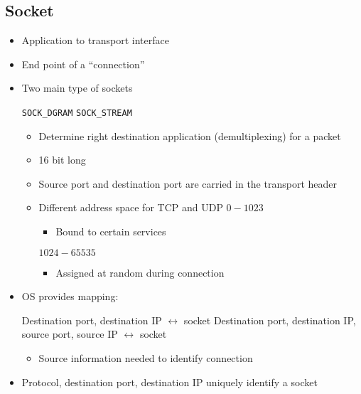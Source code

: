 \subsection{Socket}
\begin{itemize}
    \item Application to transport interface
    \item End point of a ``connection''
    \item Two main type of sockets
        \begin{itemize}
             \verb+SOCK_DGRAM+
             \verb+SOCK_STREAM+
        \end{itemize}
        \begin{itemize}
            \item Determine right destination application (demultiplexing) for a packet
            \item 16 bit long
            \item Source port and destination port are carried in the transport header
            \item Different address space for TCP and UDP
             $0 - 1023$
                \begin{itemize}
                    \item Bound to certain services
                \end{itemize}
             $1024 - 65535$
                \begin{itemize}
                    \item Assigned at random during connection
                \end{itemize}
        \end{itemize}
    \item OS provides mapping:
        \begin{itemize}
             Destination port, destination IP $\leftrightarrow$ socket
             Destination port, destination IP, source port, source IP $\leftrightarrow$ socket
                \begin{itemize}
                    \item Source information needed to identify connection
                \end{itemize}
        \end{itemize}
    \item Protocol, destination port, destination IP uniquely identify a socket
\end{itemize}

